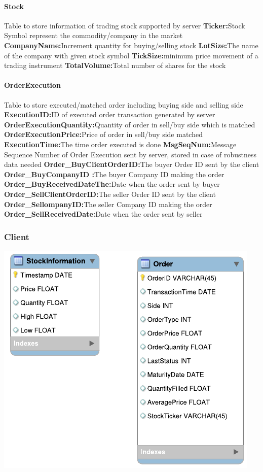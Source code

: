 \documentclass[a4paper, 11pt]{article}
\begin{document}
\paragraph*{Stock}
Table to store information of trading stock supported by server
\textbf{Ticker:}Stock Symbol represent the commodity/company in the market
\textbf{CompanyName:}Increment quantity for buying/selling stock
\textbf{LotSize:}The name of the company with given stock symbol
\textbf{TickSize:}minimum price movement of a trading instrument
\textbf{TotalVolume:}Total number of shares for the stock
 	 
\paragraph*{OrderExecution}
Table to store executed/matched order including buying side and selling side
\textbf{ExecutionID:}ID of executed order transaction generated by server
\textbf{OrderExecutionQuantity:}Quantity of order in sell/buy side which is matched
\textbf{OrderExecutionPrice:}Price of order in sell/buy side matched
\textbf{ExecutionTime:}The time order executed is done
\textbf{MsgSeqNum:}Message Sequence Number of Order Execution sent by server, stored in case of robustness data needed	
\textbf{Order_BuyClientOrderID:}The buyer Order ID sent by the client 
\textbf{Order_BuyCompanyID :}The buyer Company ID making the order	
\textbf{Order_BuyReceivedDateThe:}Date when the order sent by buyer 
\textbf{Order_SellClientOrderID:}The seller Order ID sent by the client
\textbf{Order_SellompanyID:}The seller Company ID making the order
\textbf{Order_SellReceivedDate:}Date when the order sent by seller 

\subsubsection*{Client}
\includegraphics{../diagrams/client_database.pdf}
\end{document}
